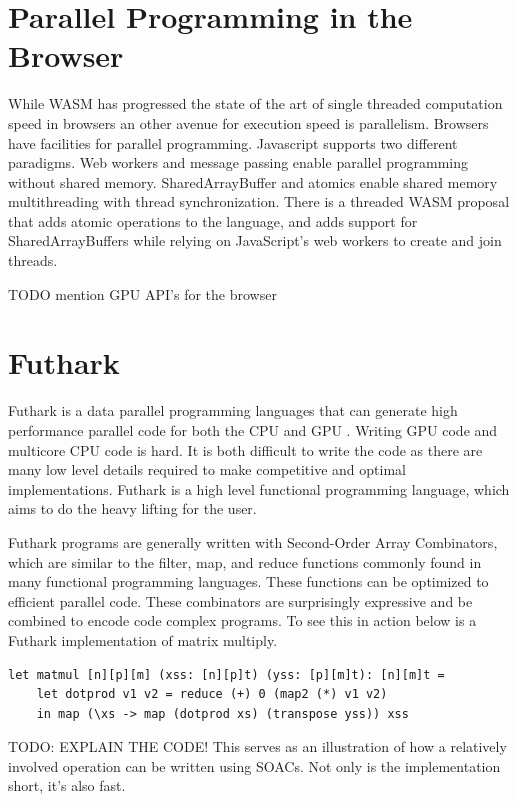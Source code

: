 \documentclass[11pt]{book}
\begin{document}
\section{Parallel Programming in the Browser}
While WASM has progressed the state of the art of single threaded computation speed in browsers an other avenue for execution speed is parallelism. Browsers have facilities for parallel programming. Javascript supports two different paradigms. Web  workers  and  message  passing  enable  parallel  programming  without  shared  memory. SharedArrayBuffer and atomics enable shared memory multithreading with thread synchronization.  There is a threaded WASM proposal that adds atomic operations to the language, and adds support for SharedArrayBuffers while relying on JavaScript’s web workers to create and join threads. 

TODO mention GPU API's for the browser

\section{Futhark}

Futhark \cite{futhark_phd} is a data parallel programming languages that can generate high performance parallel code for both the CPU and GPU .  Writing GPU code and multicore CPU code is hard. It is both difficult to write the code as there are many low level details required to make competitive and optimal implementations. Futhark is a high level functional programming language, which aims to do the heavy lifting for the user.

Futhark programs are generally written with Second-Order Array Combinators, which are similar to the filter, map, and reduce functions commonly found in many functional programming languages. These functions can be optimized to efficient parallel code. These combinators are surprisingly expressive and be combined to encode code complex programs. To see this in action below is a Futhark implementation of matrix multiply.

\begin{verbatim}
let matmul [n][p][m] (xss: [n][p]t) (yss: [p][m]t): [n][m]t =
    let dotprod v1 v2 = reduce (+) 0 (map2 (*) v1 v2)
    in map (\xs -> map (dotprod xs) (transpose yss)) xss
\end{verbatim}
TODO: EXPLAIN THE CODE!
This serves as an illustration of how a relatively involved operation can be written using SOACs. Not only is the implementation short, it's also fast.
\end{document}
